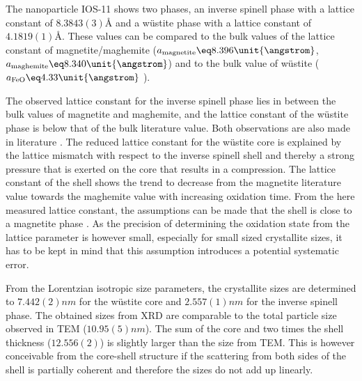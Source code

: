 \documentclass[\main/dresen_thesis.tex]{subfiles}
\begin{document}
    The nanoparticle IOS-11 shows two phases, an inverse spinell phase with a lattice constant of $8.3843(3) \unit{\angstrom}$ and a w\"ustite phase with a lattice constant of $4.1819(1) \unit{\angstrom}$.
    These values can be compared to the bulk values of the lattice constant of magnetite/maghemite ($a_\mathrm{magnetite} \eq 8.396 \unit{\angstrom}$, $a_\mathrm{maghemite} \eq 8.340 \unit{\angstrom}$) \cite{Cornell_2003_Their} and to the bulk value of w\"ustite ($a_\mathrm{FeO} \eq 4.33 \unit{\angstrom}$ \cite{Hentschel_1970_Stoich}).

    The observed lattice constant for the inverse spinell phase lies in between the bulk values of magnetite and maghemite, and the lattice constant of the w\"ustite phase is below that of the bulk literature value.
    Both observations are also made in literature \cite{Wetterskog_2013_Anoma}.
    The reduced lattice constant for the w\"ustite core is explained by the lattice mismatch with respect to the inverse spinell shell and thereby a strong pressure that is exerted on the core that results in a compression.
    The lattice constant of the shell shows the trend to decrease from the magnetite literature value towards the maghemite value with increasing oxidation time.
    From the here measured lattice constant, the assumptions can be made that the shell is close to a magnetite phase \cite{Cervellino_2014_Latti}.
    As the precision of determining the oxidation state from the lattice parameter is however small, especially for small sized crystallite sizes, it has to be kept in mind that this assumption introduces a potential systematic error.

    From the Lorentzian isotropic size parameters, the crystallite sizes are determined to $7.442(2) \unit{nm}$ for the w\"ustite core and $2.557(1) \unit{nm}$ for the inverse spinell phase.
    The obtained sizes from XRD are comparable to the total particle size observed in TEM ($10.95(5) \unit{nm}$).
    The sum of the core and two times the shell thickness ($12.556(2)$) is slightly larger than the size from TEM.
    This is however conceivable from the core-shell structure if the scattering from both sides of the shell is partially coherent and therefore the sizes do not add up linearly.


\end{document}
